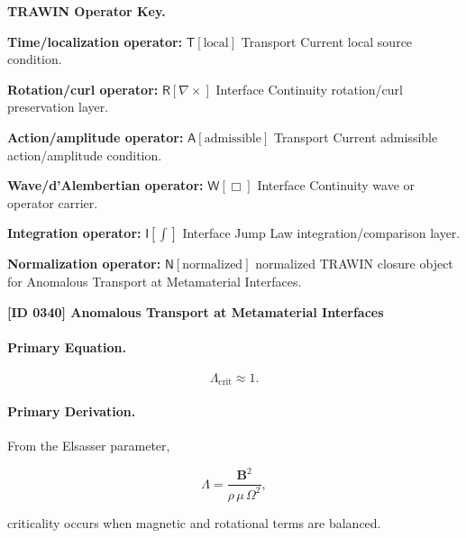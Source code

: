 \par\vspace{0.45\baselineskip}
\noindent\begin{minipage}[t]{\linewidth}
\begingroup
\small
\raggedright
\textbf{TRAWIN Operator Key.}\par
\noindent\textbf{Time/localization operator:} $\mathsf{T}\!\left[\mathrm{local}\right]$ Transport Current local source condition.\par
\noindent\textbf{Rotation/curl operator:} $\mathsf{R}\!\left[\nabla\times\right]$ Interface Continuity rotation/curl preservation layer.\par
\noindent\textbf{Action/amplitude operator:} $\mathsf{A}\!\left[\mathrm{admissible}\right]$ Transport Current admissible action/amplitude condition.\par
\noindent\textbf{Wave/d'Alembertian operator:} $\mathsf{W}\!\left[\Box\right]$ Interface Continuity wave or operator carrier.\par
\noindent\textbf{Integration operator:} $\mathsf{I}\!\left[\int\right]$ Interface Jump Law integration/comparison layer.\par
\noindent\textbf{Normalization operator:} $\mathsf{N}\!\left[\mathrm{normalized}\right]$ normalized TRAWIN closure object for Anomalous Transport at Metamaterial Interfaces.\par
\endgroup
\end{minipage}

\clearpage
\noindent\textbf{[ID 0340] Anomalous Transport at Metamaterial Interfaces}\par
\vspace{0.35em}
\paragraph{Primary Equation.}
\begin{equation}
\Lambda_{\mathrm{crit}}\approx 1 .
\end{equation}

\paragraph{Primary Derivation.}
From the Elsasser parameter,

\begin{equation}
\Lambda
=
\frac{\mathbf{B}^2}
{\rho\,\mu\,\Omega^2},
\end{equation}

criticality occurs when magnetic and rotational terms are balanced.

